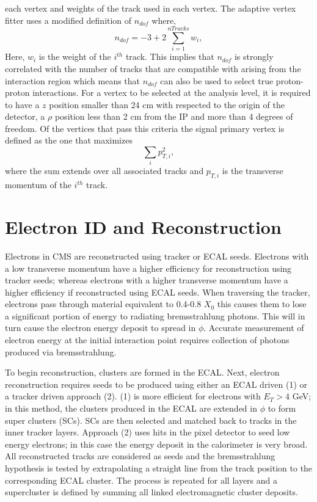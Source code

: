each vertex and weights of the track used in each vertex. The adaptive vertex fitter 
uses a modified definition of $n_{dof}$ where, 
\begin{equation} 
n_{dof} = -3+2\sum^{nTracks}_{i=1} w_{i},
\end{equation}
Here, $w_{i}$ is the weight of the $i^{th}$ track. This implies that $n_{dof}$ is strongly 
correlated with the number of tracks that are compatible with arising from the interaction 
region which means that $n_{dof}$ can also be used to select true proton-proton interactions. 
For a vertex to be selected at the analysis level, it is required to have a $z$ position 
smaller than 24 cm with respected to the origin of the detector, a $\rho$ position 
less than 2 cm from the IP and more than 4 degrees of freedom. Of the vertices 
that pass this criteria the signal primary vertex is defined as the one that maximizes 
\begin{equation}
\sum_{i} p_{T,i}^{2},
\end{equation}
where the sum extends over all associated tracks and $p_{T,i}$ is the transverse momentum 
of the $i^{th}$ track.
\section{Electron ID and Reconstruction}
\label{sec:electronReco}
Electrons in CMS are reconstructed using tracker or ECAL seeds. 
Electrons with a low transverse momentum have a higher efficiency 
for reconstruction using tracker seeds; whereas electrons with a
higher transverse momentum have a higher efficiency if reconstructed
using ECAL seeds. When traversing the tracker, electrons pass through 
material equivalent to 0.4-0.8 $X_{0}$ 
this causes them to lose a significant portion of 
energy to radiating bremsstrahlung photons. 
This will in turn cause the electron energy deposit to spread in $\phi$. 
Accurate measurement of electron energy 
at the initial interaction point 
requires collection of photons produced via bremsstrahlung.

To begin reconstruction, 
clusters are formed in the ECAL. %
Next, electron reconstruction requires
seeds to be produced using either an ECAL driven (1) or a tracker driven approach (2).
(1) is more efficient for electrons with $E_{T}>4$ GeV;
in this method, the clusters produced in the ECAL are
extended in $\phi$ to form super clusters (SCs). 
SCs are then selected and matched back to tracks in the inner tracker layers. 
Approach (2) uses hits in the pixel detector to seed
low energy electrons; in this case the energy deposit in the calorimeter
is very broad. All reconstructed tracks are considered as seeds
and the bremsstrahlung hypothesis is tested
by extrapolating a straight line from the track position to the
corresponding ECAL cluster. The process is 
repeated for all layers and a supercluster is defined
by summing all linked electromagnetic cluster deposits. 

